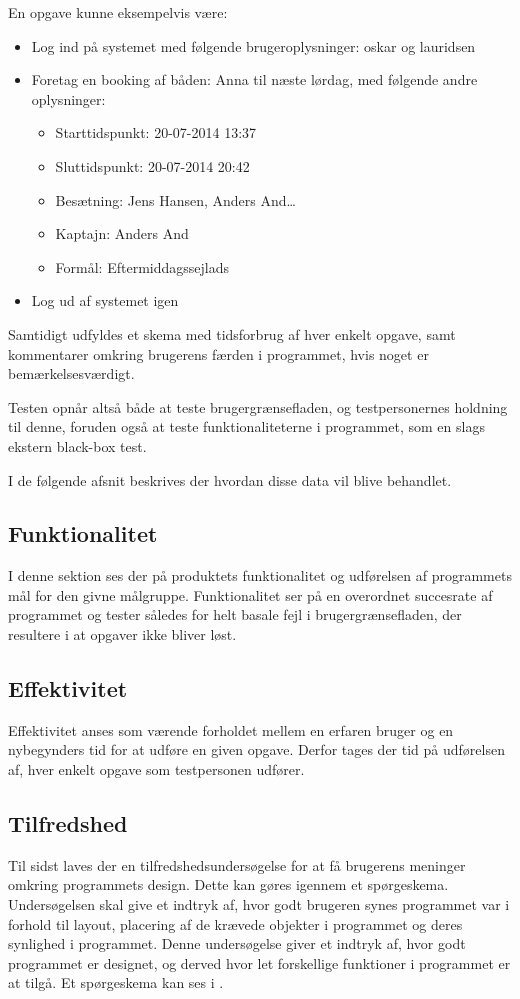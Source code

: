En opgave kunne eksempelvis være:
\begin{itemize}
	\item Log ind på systemet med følgende brugeroplysninger: oskar og lauridsen
	\item Foretag en booking af båden: Anna til næste lørdag, med følgende andre oplysninger: 
	\begin{itemize}
		\item Starttidspunkt: 20-07-2014 13:37
		\item Sluttidspunkt: 20-07-2014 20:42
		\item Besætning: Jens Hansen, Anders And\ldots
		\item Kaptajn: Anders And
		\item Formål: Eftermiddagssejlads
	\end{itemize}
	\item Log ud af systemet igen
\end{itemize}

Samtidigt udfyldes et skema med tidsforbrug af hver enkelt opgave, samt kommentarer omkring brugerens færden i programmet, hvis noget er bemærkelsesværdigt. 

Testen opnår altså både at teste brugergrænsefladen, og testpersonernes holdning til denne, foruden også at teste funktionaliteterne i programmet, som en slags ekstern black-box test.

I de følgende afsnit beskrives der hvordan disse data vil blive behandlet.

\subsection{Funktionalitet}
I denne sektion ses der på produktets funktionalitet og udførelsen af programmets mål for den givne målgruppe.
Funktionalitet ser på en overordnet succesrate af programmet og tester således for helt basale fejl i brugergrænsefladen, der resultere i at opgaver ikke bliver løst. 

\subsection{Effektivitet}
Effektivitet anses som værende forholdet mellem en erfaren bruger og en nybegynders tid for at udføre en given opgave.\citep{UIEffeciency}
Derfor tages der tid på udførelsen af, hver enkelt opgave som testpersonen udfører.

\subsection{Tilfredshed}
Til sidst laves der en tilfredshedsundersøgelse for at få brugerens meninger omkring programmets design. 
Dette kan gøres igennem et spørgeskema. 
Undersøgelsen skal give et indtryk af, hvor godt brugeren synes programmet var i forhold til layout, placering af de krævede objekter i programmet og deres synlighed i programmet. 
Denne undersøgelse giver et indtryk af, hvor godt programmet er designet, og derved hvor let forskellige funktioner i programmet er at tilgå. 
Et spørgeskema kan ses i . \citep{UISatisfaction}


